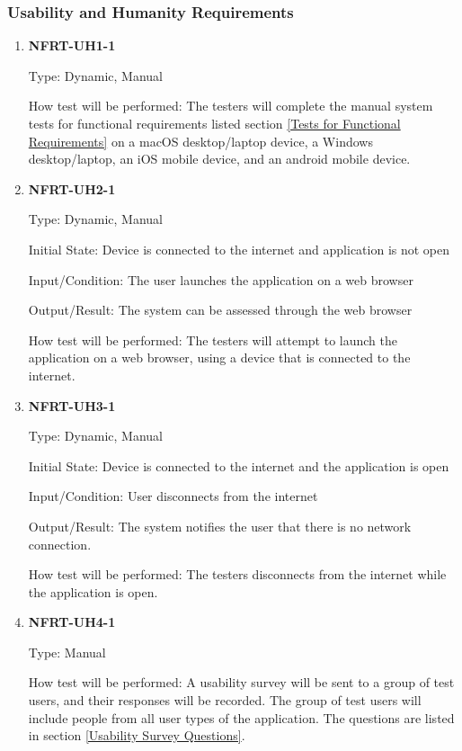 \documentclass[12pt, titlepage]{article}
\begin{document}
\subsubsection{Usability and Humanity Requirements}
\begin{enumerate}

	\item \textbf{NFRT-UH1-1} %

	      Type: Dynamic, Manual

	      How test will be performed: The testers will complete the manual system tests for functional
	      requirements listed section \ref{Tests for Functional Requirements} on a macOS desktop/laptop
	      device, a Windows desktop/laptop, an iOS mobile device, and an android mobile device.

	\item \textbf{NFRT-UH2-1} %

	      Type: Dynamic, Manual

	      Initial State: Device is connected to the internet and application is not open

	      Input/Condition: The user launches the application on a web browser

	      Output/Result: The system can be assessed through the web browser

	      How test will be performed: The testers will attempt to launch the application on a web browser,
	      using a device that is connected to the internet.

	\item \textbf{NFRT-UH3-1} %

	      Type: Dynamic, Manual

	      Initial State: Device is connected to the internet and the application is open

	      Input/Condition: User disconnects from the internet

	      Output/Result: The system notifies the user that there is no network connection.

	      How test will be performed: The testers disconnects from the internet while the application is
	      open.

	\item \textbf{NFRT-UH4-1}

	      Type: Manual

	      How test will be performed: A usability survey will be sent to a group of test users, and their
	      responses will be recorded. The group of test users will include people from all user types of the
	      application. The questions are listed in section \ref{Usability Survey Questions}.

\end{enumerate}
\end{document}
